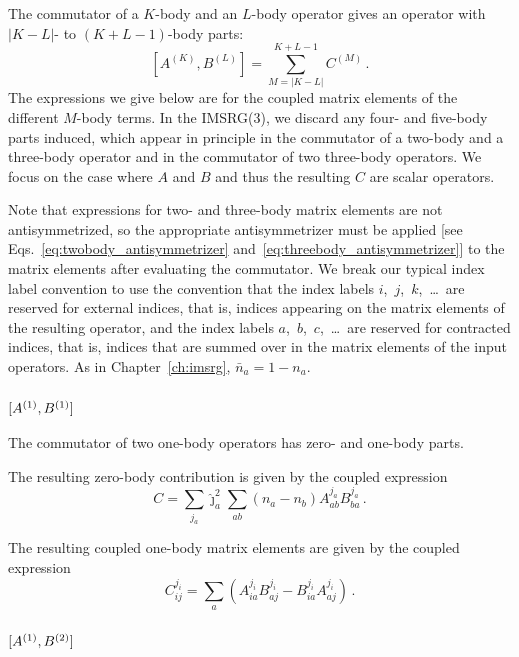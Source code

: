 The commutator of a $K$-body and an $L$-body operator
gives an operator with \mbox{$|K-L|$-} to $(K+L-1)$-body parts:
\begin{equation}
  \left[A^{(K)}, B^{(L)}\right] = \sum_{M=|K - L|}^{K + L - 1} C^{(M)}\,.
\end{equation}
The expressions we give below are
for the coupled matrix elements of the different $M$-body terms.
In the IMSRG(3), we discard any four- and five-body parts induced,
which appear in principle
in the commutator of a two-body and a three-body operator
and in the commutator of two three-body operators.
We focus on the case where $A$ and $B$ and thus the resulting $C$ are scalar operators.

Note that expressions for two- and three-body matrix elements
are not antisymmetrized,
so the appropriate antisymmetrizer must be applied
  [see Eqs.~\eqref{eq:twobody_antisymmetrizer} and~\eqref{eq:threebody_antisymmetrizer}]
to the matrix elements after evaluating the commutator.
We break our typical index label convention
to use the convention that the index labels $i$,~$j$,~$k$,~\ldots\
are reserved for external indices,
that is, indices appearing on the matrix elements of the resulting operator,
and the index labels $a$,~$b$,~$c$,~\ldots\
are reserved for contracted indices,
that is, indices that are summed over in the matrix elements of the input operators.
As in Chapter~\ref{ch:imsrg}, $\bar{n}_a = 1 - n_a$.

\subsubsection{
  \texorpdfstring{$[{A}^{(1)}, {B}^{(1)}]$}{[1, 1]}
}

The commutator of two one-body operators has
zero- and one-body parts.

The resulting zero-body contribution is given by the coupled expression
\begin{equation}
  C = \sum_{j_a} \hat{\jmath}^{2}_{a} \sum_{ab} (n_a - n_b) A_{ab}^{j_a} B_{ba}^{j_a}\,.
\end{equation}

The resulting coupled one-body matrix elements are given by the coupled expression
\begin{equation}
  C_{ij}^{j_i} = \sum_{a}(A_{ia}^{j_i} B_{aj}^{j_i} - B_{ia}^{j_i} A_{aj}^{j_i})\,.
\end{equation}

\subsubsection{
  \texorpdfstring{$[{A}^{(1)}, {B}^{(2)}]$}{[1, 2]}
}

